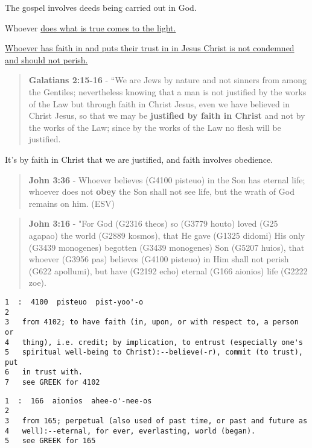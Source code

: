 \documentclass[11pt]{article}
\begin{document}
The gospel involves deeds being carried out in God.

Whoever \uline{does what is true comes to the light.}

\uline{Whoever has faith in and puts their trust in in Jesus Christ is not condemned and should not perish.}

\begin{quote}
\textbf{Galatians 2:15-16} - “We are Jews by nature and not sinners from among the Gentiles; nevertheless knowing that a man is not justified by the works of the Law but through faith in Christ Jesus, even we have believed in Christ Jesus, so that we may be \textbf{justified by faith in Christ} and not by the works of the Law; since by the works of the Law no flesh will be justified.
\end{quote}

It's by faith in Christ that we are justified, and faith involves obedience.

\begin{quote}
\textbf{John 3:36} - Whoever believes (G4100 pisteuo) in the Son has eternal life; whoever does not \textbf{obey} the Son shall not see life, but the wrath of God remains on him. (ESV)
\end{quote}

\begin{quote}
\textbf{John 3:16} - "For God (G2316 theos) so (G3779 houto) loved (G25 agapao) the world (G2889 kosmos), that He gave (G1325 didomi) His only (G3439 monogenes) begotten (G3439 monogenes) Son (G5207 huios), that whoever (G3956 pas) believes (G4100 pisteuo) in Him shall not perish (G622 apollumi), but have (G2192 echo) eternal (G166 aionios) life (G2222 zoe).
\end{quote}

\begin{verbatim}
1  :  4100  pisteuo  pist-yoo'-o
2  
3   from 4102; to have faith (in, upon, or with respect to, a person or
4   thing), i.e. credit; by implication, to entrust (especially one's
5   spiritual well-being to Christ):--believe(-r), commit (to trust), put
6   in trust with.
7   see GREEK for 4102
\end{verbatim}

\begin{verbatim}
1  :  166  aionios  ahee-o'-nee-os
2  
3   from 165; perpetual (also used of past time, or past and future as
4   well):--eternal, for ever, everlasting, world (began).
5   see GREEK for 165
\end{verbatim}
\end{document}
